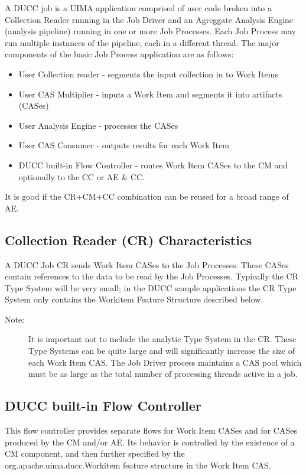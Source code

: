 A DUCC job is a UIMA application comprised of user code broken into a Collection
Reader running in the Job Driver and an Agreggate Analysis Engine (analysis pipeline) running in one 
or more Job Processes. Each Job Process may run multiple instances of the pipeline, each in a different
thread. The major components of the basic Job Process application are as follows:

\begin{itemize}
  \item User Collection reader - segments the input collection in to Work Items
  \item User CAS Multiplier - inputs a Work Item and segments it into artifacts (CASes)
  \item User Analysis Engine - processes the CASes
  \item User CAS Consumer - outputs results for each Work Item
  \item DUCC built-in Flow Controller - routes Work Item CASes to the CM and optionally to the CC or AE \& CC.
\end{itemize}

It is good if the CR+CM+CC combination can be reused for a broad range of AE.

\subsection{Collection Reader (CR) Characteristics}
A DUCC Job CR sends Work Item CASes to the Job Processes. These CASes contain references to the data
to be read by the Job Processes. Typically the CR Type System will be very small; in the DUCC sample
applications the CR Type System only contains the Workitem Feature Structure described below.

\begin{description}
    \item[Note:] It is important not to include the analytic Type System in the CR. These Type Systems 
can be quite large and will significantly increase the size of each Work Item CAS. 
The Job Driver process maintains a CAS pool which must be as large
as the total number of processing threads active in a job. 
\end{description}

\subsection{DUCC built-in Flow Controller}
\begin{sloppypar}
This flow controller provides separate flows for Work Item CASes and for CASes produced by the CM and/or AE.
Its behavior is controlled by the existence of a CM component, and then further specified by the
org.apache.uima.ducc.Workitem feature structure in the Work Item CAS.
\end{sloppypar}

